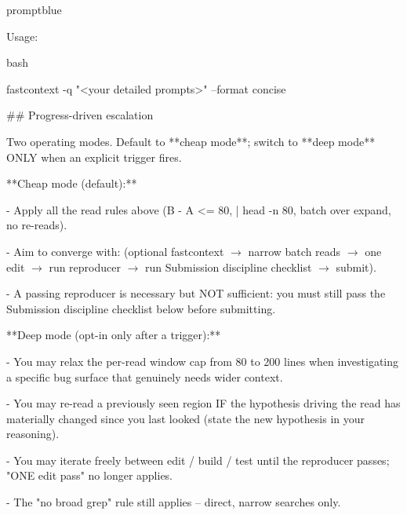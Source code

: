 \begin{promptbox}{promptblue}
{\vspace{0.35em}\par
Usage:\par
\textasciigrave{}\textasciigrave{}\textasciigrave{}bash\par
fastcontext -q "\textless{}your detailed prompts\textgreater{}" --format concise\par
\textasciigrave{}\textasciigrave{}\textasciigrave{}\par
\vspace{0.35em}\par
\#\# Progress-driven escalation\par
\vspace{0.35em}\par
Two operating modes. Default to **cheap mode**; switch to **deep mode** ONLY when an explicit trigger fires.\par
\vspace{0.35em}\par
**Cheap mode (default):**\par
- Apply all the read rules above (\textasciigrave{}B - A \textless{}= 80\textasciigrave{}, \textasciigrave{}| head -n 80\textasciigrave{}, batch over expand, no re-reads).\par
- Aim to converge with: (optional fastcontext $\to$ narrow batch reads $\to$ one edit $\to$ run reproducer $\to$ run Submission discipline checklist $\to$ submit).\par
- A passing reproducer is necessary but NOT sufficient: you must still pass the Submission discipline checklist below before submitting.\par
\vspace{0.35em}\par
**Deep mode (opt-in only after a trigger):**\par
- You may relax the per-read window cap from 80 to 200 lines when investigating a specific bug surface that genuinely needs wider context.\par
- You may re-read a previously seen region IF the hypothesis driving the read has materially changed since you last looked (state the new hypothesis in your reasoning).\par
- You may iterate freely between edit / build / test until the reproducer passes; "ONE edit pass" no longer applies.\par
- The "no broad grep" rule still applies -- direct, narrow searches only.\par
\vspace{0.35em}\par
}
\end{promptbox}

